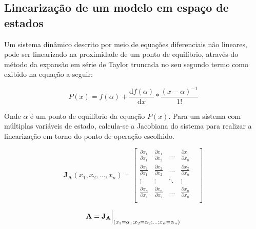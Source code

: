\subsection{Linearização de um modelo em espaço de estados}
Um sistema dinâmico descrito por meio de equações diferenciais não lineares, pode ser linearizado na proximidade de um ponto de equilíbrio, através do método da expansão em série de Taylor truncada no seu segundo termo como exibido na equação a seguir:
    
\begin{equation}
        P(x) = f(\alpha) + \dfrac{\mathrm{d}f(\alpha)}{\mathrm{d}x}*\frac{(x-\alpha)^{-1}}{1!}    
\end{equation}
    
Onde $\alpha$ é um ponto de equilíbrio da equação $P(x)$.  
Para um sistema com múltiplas variáveis de estado, calcula-se a Jacobiana do sistema para realizar a linearização em torno do ponto de operação escolhido.  
    
\begin{equation} \label{eq:Jacobian_A}
    \mathbf{J_A}(x_1,x_2,\dots,x_n) =
    \begin{bmatrix}
        \frac{\partial x_1}{\partial x_1} & 
        \frac{\partial x_1}{\partial x_2} & 
        \dots &
        \frac{\partial x_1}{\partial x_n} &\\[1ex]
        \frac{\partial x_2}{\partial x_1} & 
        \frac{\partial x_2}{\partial x_2} & 
        \dots &
        \frac{\partial x_2}{\partial x_n} &\\[1ex]
        \vdots & 
        \vdots & 
        \ddots &
        \vdots &\\[1ex]
        \frac{\partial x_n}{\partial x_1} & 
        \frac{\partial x_n}{\partial x_2} & 
        \dots &
        \frac{\partial x_n}{\partial x_n} &\\[1ex]
    \end{bmatrix}
\end{equation}
    
\begin{equation} \label{eq:eval_A}
    \mathbf{A=J_A} \Bigr\rvert_{(x_1=\alpha_1;x_2=\alpha_2;\dots;x_n=\alpha_n)} \\
\end{equation}
    

